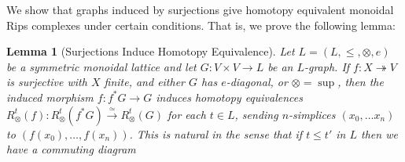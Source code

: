 \documentclass[a4paper,11pt]{article}
\newcommand{\tensor}{\otimes}
\newcounter{dummy}\numberwithin{dummy}{section}
\newtheorem{lemma}[dummy]{Lemma}
\theoremstyle{remark}
\begin{document}
We show that graphs induced by surjections give homotopy equivalent monoidal Rips complexes under certain conditions. That is, we prove the following lemma:

\begin{lemma}[Surjections Induce Homotopy Equivalence]\label{lem:surjection_induce_isomorphism_on_homology}
Let $L=(L,\leq,\tensor,e)$ be a symmetric monoidal lattice and let $G\colon V\times V\to L$ be an $L$-graph. If $f\colon X\twoheadrightarrow V$ is surjective with $X$ finite, and either $G$ has $e$-diagonal, or $\tensor=\sup$, then the induced morphism $f:f^*G\to G$ induces homotopy equivalences $R^t_\tensor(f):R^t_\tensor(f^*G)\xrightarrow{\simeq}R^t_\tensor(G)$ for each $t\in L$, sending $n$-simplices $(x_0,\dots x_n)$ to $(f(x_0),\dots, f(x_n))$. This is natural in the sense that if $t\leq t'$ in $L$ then we have a commuting diagram
\begin{center}
\end{center}
\end{lemma}
\end{document}
